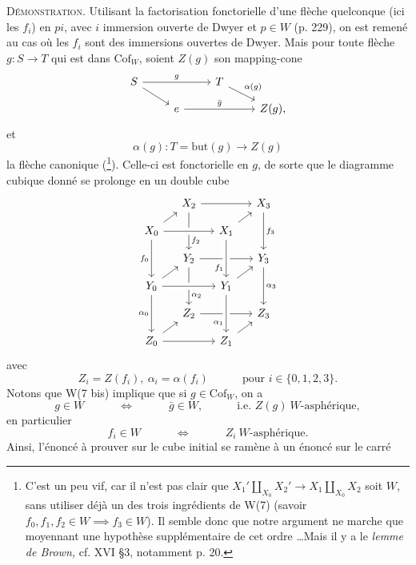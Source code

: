 \documentclass[11pt]{article}
\newcommand{\printedpage}[1]{\marginpar{\footnotesize p.~#1}}
\newcommand{\msp}[1]{\marginpar{\footnotesize [#1]}}
\newcommand{\Cof}{\mathrm{Cof}}
\begin{document}
\textsc{Démonstration.} Utilisant la factorisation
\printedpage{173}
\msp{page 266}
fonctorielle d'une flèche quelconque (ici les $f_i$) en $pi$, avec $i$ immersion ouverte de Dwyer et $p \in W$ (p. 229), on est remené au cas où les $f_i$ sont des immersions ouvertes de Dwyer. Mais pour toute flèche $g : S \longrightarrow T$ qui est dans $\Cof_W$, soient $Z(g)$ son mapping-cone %
\[
\begin{tikzcd}[ampersand replacement=\&, row sep=small]
S \arrow[rr, "g"] \arrow[dr] \& \& T \arrow[dr, "\alpha(g)"] \& \\
 \& e \arrow[rr, "\bar{g}"] \& \& Z(g),
\end{tikzcd}
\]
et
\[
\alpha(g) : T = \mathrm{but}(g) \longrightarrow Z(g)
\]
la flèche canonique (\footnote[136]{C'est un peu vif, car il n'est pas clair que $X_1' \amalg_{X_0} X_2' \longrightarrow X_1 \amalg_{X_0} X_2$ soit $W$, sans utiliser déjà un des trois ingrédients de W(7) (savoir $f_0, f_1, f_2 \in W \implies f_3 \in W$). Il semble donc que notre argument ne marche que moyennant une hypothèse supplémentaire de cet ordre \dots Mais il y a le \textit{lemme de Brown,} cf. XVI \S3, notamment p. 20.}). Celle-ci est fonctorielle en $g$, de sorte que le diagramme cubique donné se prolonge en un double cube
\[
\begin{tikzcd}[ampersand replacement=\&, row sep=small, column sep=small]
 \& X_2 \arrow[rr] \arrow[dd, "f_2" near end] \& \& X_3 \arrow[dd, "f_3"] \\
X_0 \arrow[ur] \arrow[rr, crossing over] \arrow[dd, "f_0"'] \& \& X_1 \arrow[ur] \& \\
 \& Y_2 \arrow[rr] \arrow[dd, "\alpha_2" near end] \& \& Y_3 \arrow[dd, "\alpha_3"] \\
Y_0 \arrow[ur] \arrow[rr, crossing over] \arrow[dd, "\alpha_0"'] \& \& Y_1 \arrow[ur] \arrow[from=uu, crossing over, "f_1"' near end] \& \\
 \& Z_2 \arrow[rr] \& \& Z_3 \\
Z_0 \arrow[ur] \arrow[rr] \& \& Z_1 \arrow[ur] \arrow[from=uu, crossing over, "\alpha_1"' near end] \&
\end{tikzcd}
\]
avec
\[
Z_i = Z(f_i),\ \alpha_i = \alpha(f_i) \qquad\quad \text{pour } i \in \{0,1,2,3\}.
\]
Notons que W(7 bis) implique que si $g \in \Cof_W$,
\msp{page 267}
on a
\[
g \in W \qquad\quad \iff \qquad\quad \bar{g} \in W, \qquad\quad \text{i.e. } Z(g)\ W\text{-asphérique},
\]
en particulier
\[
f_i \in W \qquad\quad \iff \qquad\quad Z_i\ W\text{-asphérique}.
\]
Ainsi, l'énoncé à prouver sur le cube initial se ramène à un énoncé sur le carré
\end{document}
